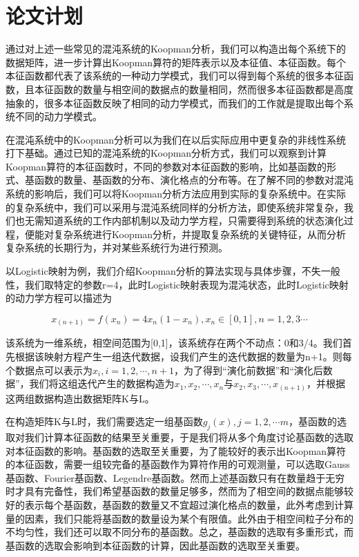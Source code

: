 \section{论文计划}
通过对上述一些常见的混沌系统的Koopman分析，我们可以构造出每个系统下的数据矩阵，进一步计算出Koopman算符的矩阵表示以及本征值、本征函数。每个本征函数都代表了该系统的一种动力学模式，我们可以得到每个系统的很多本征函数，且本征函数的数量与相空间的数据点的数量相同，然而很多本征函数都是高度抽象的，很多本征函数反映了相同的动力学模式，而我们的工作就是提取出每个系统不同的动力学模式。

在混沌系统中的Koopman分析可以为我们在以后实际应用中更复杂的非线性系统打下基础。通过已知的混沌系统的Koopman分析方式，我们可以观察到计算Koopman算符的本征函数时，不同的参数对本征函数的影响，比如基函数的形式、基函数的数量、基函数的分布、演化格点的分布等。在了解不同的参数对混沌系统的影响后，我们可以将Koopman分析方法应用到实际的复杂系统中。在实际的复杂系统中，我们可以采用与混沌系统同样的分析方法，即使系统非常复杂，我们也无需知道系统的工作内部机制以及动力学方程，只需要得到系统的状态演化过程，便能对复杂系统进行Koopman分析，并提取复杂系统的关键特征，从而分析复杂系统的长期行为，并对某些系统行为进行预测。

以Logistic映射为例，我们介绍Koopman分析的算法实现与具体步骤，不失一般性，我们取特定的参数r=4，此时Logistic映射表现为混沌状态，此时Logistic映射的动力学方程可以描述为

$$x_(n+1)=f(x_n )=4x_n (1-x_n ),x_n∈[0,1],n=1,2,3⋯$$

该系统为一维系统，相空间范围为[0,1]，该系统存在两个不动点：0和3/4。我们首先根据该映射方程产生一组迭代数据，设我们产生的迭代数据的数量为n+1。则每个数据点可以表示为$x_i,i=1,2,⋯,n+1$，为了得到“演化前数据”和“演化后数据”，我们将这组迭代产生的数据构造为${x_1,x_2,⋯,x_n }与{x_2,x_3,⋯,x_(n+1) }$，并根据这两组数据构造出数据矩阵K与L。

在构造矩阵K与L时，我们需要选定一组基函数${g_j (x)},j=1,2,⋯m$，基函数的选取对我们计算本征函数的结果至关重要，于是我们将从多个角度讨论基函数的选取对本征函数的影响。基函数的选取至关重要，为了能较好的表示出Koopman算符的本征函数，需要一组较完备的基函数作为算符作用的可观测量，可以选取Gauss基函数、Fourier基函数、Legendre基函数。然而上述基函数只有在数量趋于无穷时才具有完备性，我们希望基函数的数量足够多，然而为了相空间的数据点能够较好的表示每个基函数，基函数的数量又不宜超过演化格点的数量，此外考虑到计算量的因素，我们只能将基函数的数量设为某个有限值。此外由于相空间粒子分布的不均匀性，我们还可以取不同分布的基函数。总之，基函数的选取有多重形式，而基函数的选取会影响到本征函数的计算，因此基函数的选取至关重要。

